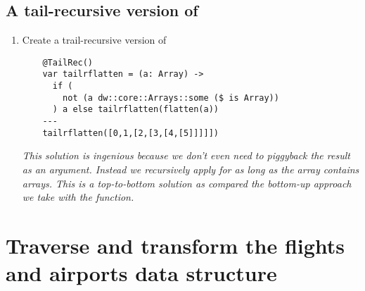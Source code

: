 \subsection{A tail-recursive version of }
\begin{enumerate}[resume*]
\item Create a trail-recursive version of 
  \begin{lstlisting}
    @TailRec()
    var tailrflatten = (a: Array) -> 
      if ( 
        not (a dw::core::Arrays::some ($ is Array))
      ) a else tailrflatten(flatten(a))
    ---
    tailrflatten([0,1,[2,[3,[4,[5]]]]])
  \end{lstlisting}
  \emph{
    This solution is ingenious because we don't even need to piggyback the result as an argument.  Instead we recursively apply  for as long as the array contains arrays.  This  is a top-to-bottom solution as compared the bottom-up approach we take with the  function.
  }
\end{enumerate}


\section{Traverse and transform the flights and airports data structure}

